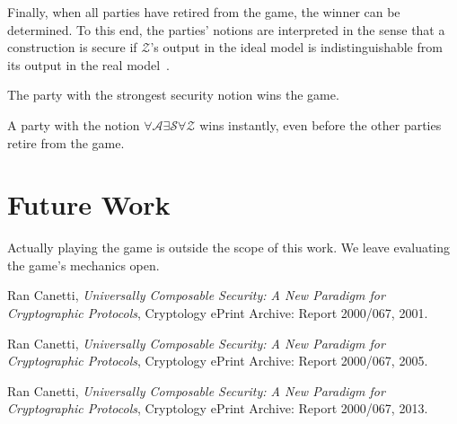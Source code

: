 \documentclass{llncs}
\begin{document}
Finally, when all parties have retired from the game, the winner can be determined. To this end, the parties' notions are interpreted in the sense that a construction is secure if $\mathcal{Z}$'s output in the ideal model is indistinguishable from its output in the real model~\cite{can01,can05,can13}.

\begin{theorem}
	The party with the strongest security notion wins the game.
\end{theorem}

\begin{theorem}
	A party with the notion $\forall\mathcal{A}\exists\mathcal{S}\forall\mathcal{Z}$ wins instantly, even before the other parties retire from the game.
\end{theorem}

\section{Future Work}
Actually playing the game is outside the scope of this work.
We leave evaluating the game's mechanics open.

\begin{thebibliography}{9}
  Ran Canetti,
  \emph{Universally Composable Security: A New Paradigm for Cryptographic Protocols},
  Cryptology ePrint Archive: Report 2000/067,
  2001.

  Ran Canetti,
  \emph{Universally Composable Security: A New Paradigm for Cryptographic Protocols},
  Cryptology ePrint Archive: Report 2000/067,
  2005.

  Ran Canetti,
  \emph{Universally Composable Security: A New Paradigm for Cryptographic Protocols},
  Cryptology ePrint Archive: Report 2000/067,
  2013.
\end{thebibliography}
\end{document}
